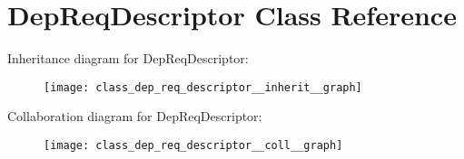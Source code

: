 \hypertarget{class_dep_req_descriptor}{}\section{Dep\+Req\+Descriptor Class Reference}
\label{class_dep_req_descriptor}


Inheritance diagram for Dep\+Req\+Descriptor\+:
\nopagebreak
\begin{figure}[H]
\begin{center}
\leavevmode
\texttt{[image: class\_dep\_req\_descriptor\_\_inherit\_\_graph]}
\end{center}
\end{figure}


Collaboration diagram for Dep\+Req\+Descriptor\+:
\nopagebreak
\begin{figure}[H]
\begin{center}
\leavevmode
\texttt{[image: class\_dep\_req\_descriptor\_\_coll\_\_graph]}
\end{center}
\end{figure}
